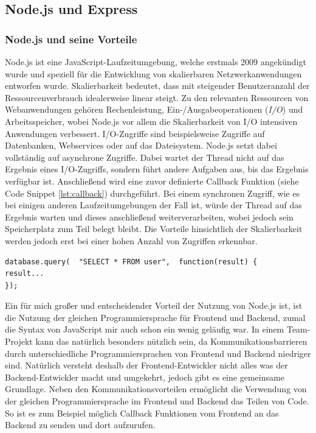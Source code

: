 \documentclass[a4paper,12pt]{report}
\newcommand{\footcite}[1]{\footnotemark\footnotetext{\cite{#1}}}
\begin{document}
        \subsection{Node.js und Express}
        \subsubsection{Node.js und seine Vorteile}
Node.js ist eine JavaScript-Laufzeitumgebung, welche erstmals 2009 angekündigt wurde\footcite{nodeyoutube} und speziell für die Entwicklung von skalierbaren Netzwerkanwendungen entworfen wurde\footcite{nodejs}. Skalierbarkeit bedeutet, dass mit steigender Benutzeranzahl der Ressourcenverbrauch idealerweise linear steigt. Zu den relevanten Ressourcen von Webanwendungen gehören Rechenleistung, Ein-/Ausgabeoperationen (\textit{I/O}) und Arbeitsspeicher, wobei Node.js vor allem die Skalierbarkeit von I/O intensiven Anwendungen verbessert\footcite{nodejsbook}.
I/O-Zugriffe sind beispielsweise Zugriffe auf Datenbanken, Webservices oder auf das Dateisystem. Node.js setzt dabei vollständig auf asynchrone Zugriffe. Dabei wartet der Thread nicht auf das Ergebnis eines I/O-Zugriffs, sondern führt andere Aufgaben aus, bis das Ergebnis verfügbar ist. Anschließend wird eine zuvor definierte Callback Funktion (siehe Code Snippet \ref{lst:callback}) durchgeführt. Bei einem synchronen Zugriff, wie es bei einigen anderen Laufzeitumgebungen der Fall ist, würde der Thread auf das Ergebnis warten und dieses anschließend weiterverarbeiten, wobei jedoch sein Speicherplatz zum Teil belegt bleibt. Die Vorteile hinsichtlich der Skalierbarkeit werden jedoch erst bei einer hohen Anzahl von Zugriffen erkennbar.

\begin{lstlisting}[style=codeStyle, caption={Beispiel einer Callback Funktion \textbf{Quelle: } \cite{nodejsbook}}, label={lst:callback}]
database.query(  "SELECT * FROM user",  function(result) {
result...
});
\end{lstlisting}


Ein für mich großer und entscheidender Vorteil der Nutzung von Node.js ist, ist die Nutzung der gleichen Programmiersprache für Frontend und Backend, zumal die Syntax von JavaScript mir auch schon ein wenig geläufig war.
In einem Team-Projekt kann das natürlich besonders nützlich sein, da Kommunikationsbarrieren durch unterschiedliche Programmiersprachen von Frontend und Backend niedriger sind. Natürlich versteht deshalb der Frontend-Entwickler nicht alles was  der Backend-Entwickler macht und umgekehrt, jedoch gibt es eine gemeinsame Grundlage. Neben den Kommunikationsvorteilen ermöglicht die Verwendung von der gleichen Programmiersprache im Frontend und Backend das Teilen von Code. So ist es zum Beispiel möglich Callback Funktionen vom Frontend an das Backend zu senden und dort aufzurufen.
\end{document}

